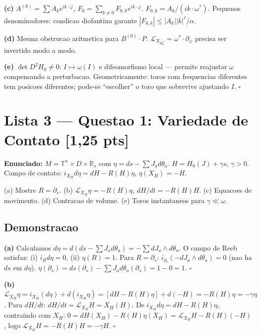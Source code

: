 \documentclass[12pt,a4paper,oneside]{article}
\begin{document}
\textbf{(c)} $A^{(0)} = \sum A_k e^{ik\cdot\varphi}$,
$F_0 = \sum_{k\neq0} F_{0,k}e^{ik\cdot\varphi}$.
$F_{0,k} = A_k/(ik\cdot\omega^*)$. Pequenos denominadores: condicao
diofantina garante $|F_{0,k}| \leq |A_k||k|^\tau/\alpha$.

\textbf{(d)} Mesma obstrucao aritmetica para $B^{(0)}\cdot P$.
$\mathcal{L}_{X_{H_0^*}} = \omega^*\cdot\partial_\varphi$ precisa ser
invertido modo a modo.

\textbf{(e)} $\det D^2H_0 \neq 0$: $I \mapsto \omega(I)$ e difeomorfismo
local — permite reajustar $\omega$ compensando a perturbacao.
Geometricamente: toros com frequencias diferentes tem posicoes diferentes;
pode-se ``escolher'' o toro que sobrevive ajustando $I$. $\square$

\newpage
\section{Lista 3 — Questao 1: Variedade de Contato [1,25 pts]}

\textbf{Enunciado:} $M = \mathbb{T}^n \times D \times \mathbb{R}_s$ com
$\eta = ds - \sum J_a d\theta_a$. $H = H_0(J) + \gamma s$, $\gamma > 0$.
Campo de contato: $i_{X_H}d\eta = dH - R(H)\eta$, $\eta(X_H) = -H$.

(a) Mostre $R = \partial_s$. (b) $\mathcal{L}_{X_H}\eta = -R(H)\eta$,
$dH/dt = -R(H)H$. (c) Equacoes de movimento. (d) Contracao de volume.
(e) Toros instantaneos para $\gamma \ll \omega$.

\subsection*{Demonstracao}

\textbf{(a)} Calculamos $d\eta = d(ds - \sum J_a d\theta_a) =
-\sum dJ_a \wedge d\theta_a$. O campo de Reeb satisfaz: (i) $i_R d\eta = 0$,
(ii) $\eta(R) = 1$. Para $R = \partial_s$: $i_{\partial_s}(-dJ_a\wedge
d\theta_a) = 0$ (nao ha $ds$ em $d\eta$). $\eta(\partial_s) = ds(\partial_s)
- \sum J_a d\theta_a(\partial_s) = 1 - 0 = 1$. $\square$

\textbf{(b)} $\mathcal{L}_{X_H}\eta = i_{X_H}(d\eta) + d(i_{X_H}\eta) =
[dH - R(H)\eta] + d(-H) = -R(H)\eta = -\gamma\eta$. Para $dH/dt$:
$dH/dt = \mathcal{L}_{X_H}H = X_H(H)$. De $i_{X_H}d\eta = dH - R(H)\eta$,
contraindo com $X_H$: $0 = dH(X_H) - R(H)\eta(X_H) = \mathcal{L}_{X_H}H -
R(H)(-H)$, logo $\mathcal{L}_{X_H}H = -R(H)H = -\gamma H$. $\square$
\end{document}
